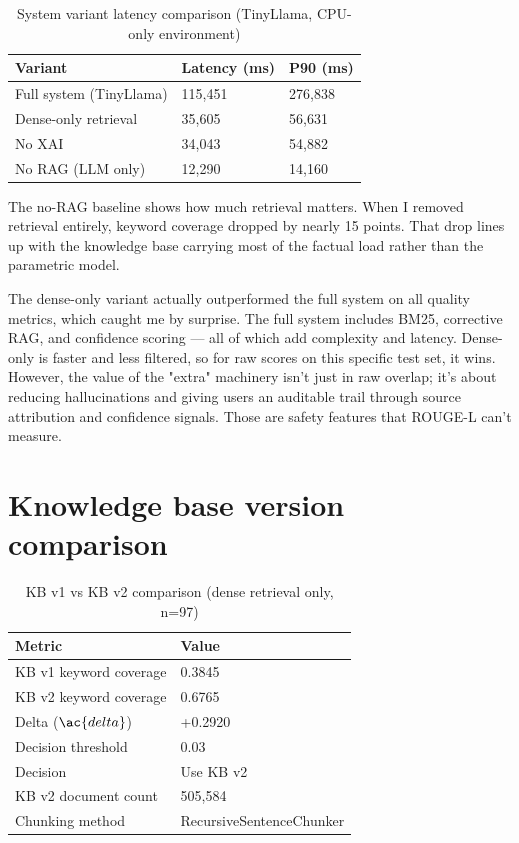 \begin{table}[htbp]
\centering
\caption{System variant latency comparison (TinyLlama, CPU-only environment)}
\label{tab:baseline_latency}
\renewcommand{\arraystretch}{1.3}
\begin{tabular}{|l|l|l|}
\hline
\textbf{Variant} & \textbf{Latency (ms)} & \textbf{P90 (ms)} \\
\hline
Full system (TinyLlama) & 115,451 & 276,838 \\
Dense-only retrieval    & 35,605  & 56,631  \\
No XAI                  & 34,043  & 54,882  \\
No RAG (LLM only)       & 12,290  & 14,160  \\
\hline
\end{tabular}
\end{table}

The no-RAG baseline shows how much retrieval matters. When I removed retrieval entirely, keyword coverage dropped by nearly 15 points. That drop lines up with the knowledge base carrying most of the factual load rather than the parametric model.

The dense-only variant actually outperformed the full system on all quality metrics, which caught me by surprise. The full system includes BM25, corrective RAG, and confidence scoring --- all of which add complexity and latency. Dense-only is faster and less filtered, so for raw scores on this specific test set, it wins. However, the value of the "extra" machinery isn't just in raw overlap; it's about reducing hallucinations and giving users an auditable trail through source attribution and confidence signals. Those are safety features that ROUGE-L can't measure.

\section{Knowledge base version comparison}

\begin{table}[htbp]
\centering
\caption{KB v1 vs KB v2 comparison (dense retrieval only, n=97)}
\renewcommand{\arraystretch}{1.3}
\begin{tabular}{|l|l|}
\hline
\textbf{Metric} & \textbf{Value} \\
\hline
KB v1 keyword coverage & 0.3845 \\
KB v2 keyword coverage & 0.6765 \\
Delta ($\ac{delta}$) & +0.2920 \\
Decision threshold & 0.03 \\
Decision & Use KB v2 \\
KB v2 document count & 505,584 \\
Chunking method & RecursiveSentenceChunker \\
\hline
\end{tabular}
\end{table}

